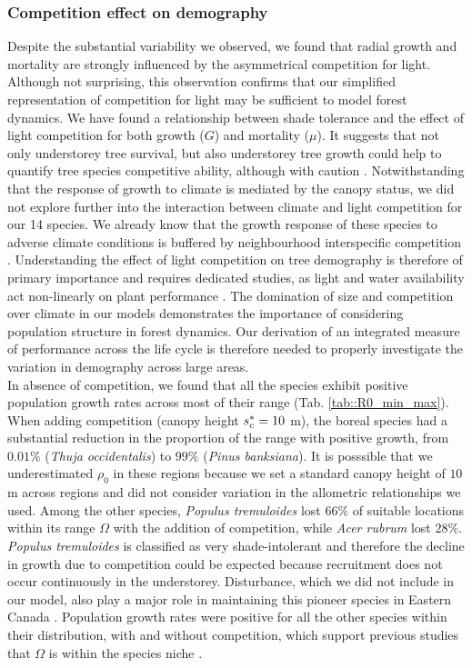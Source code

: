\subsubsection{Competition effect on demography}
Despite the substantial variability we observed, we found that radial growth and mortality are strongly influenced by the asymmetrical competition for light. Although not surprising, this observation confirms that our simplified representation of competition for light may be sufficient to model forest dynamics. We have found a relationship between shade tolerance and the effect of light competition for both growth ($ G $) and mortality ($ \mu $). It suggests that not only understorey tree survival, but also understorey tree growth could help to quantify tree species competitive ability, although with caution \citep{Feng2018}. Notwithstanding that the response of growth to climate is mediated by the canopy status, we did not explore further into the interaction between climate and light competition for our 14 species. We already know that the growth response of these species to adverse climate conditions is buffered by neighbourhood interspecific competition \citep{Aussenac2019}. Understanding the effect of light competition on tree demography is therefore of primary importance and requires dedicated studies, as light and water availability act non-linearly on plant performance \citep{Holmgren2012}. The domination of size and competition over climate in our models demonstrates the importance of considering population structure in forest dynamics. Our derivation of an integrated measure of performance across the life cycle is therefore needed to properly investigate the variation in demography across large areas. \\

In absence of competition, we found that all the species exhibit positive population growth rates across most of their range (Tab. \ref{tab::R0_min_max}). When adding competition (canopy height $ {s}^{*}_c = 10 $ m), the boreal species had a substantial reduction in the proportion of the range with positive growth, from $ 0.01 \% $ (\textit{Thuja occidentalis}) to $ 99 \% $ (\textit{Pinus banksiana}). It is posssible that we underestimated $  \rho_0 $ in these regions because we set a standard canopy height of $ 10 $ m across regions and did not consider variation in the allometric relationships we used. Among the other species, \textit{Populus tremuloides} lost $ 66 \% $ of suitable locations within its range $ \Omega $ with the addition of competition, while \textit{Acer rubrum} lost $ 28 \% $. \textit{Populus tremuloides} is classified as very shade-intolerant \citep{Burns1990a} and therefore the decline in growth due to competition could be expected because recruitment does not occur continuously in the understorey. Disturbance, which we did not include in our model, also play a major role in maintaining this pioneer species in Eastern Canada \citep{Nlungu-Kweta2017}. Population growth rates were positive for all the other species within their distribution, with and without competition, which support previous studies that $ \Omega $ is within the species niche \citep{Lee-Yaw2016, Csergo2017}.

